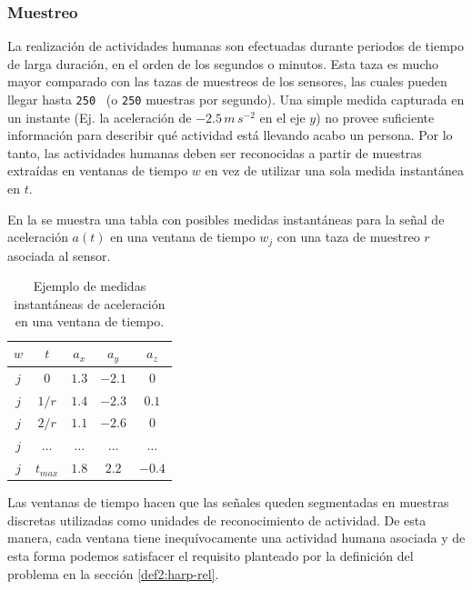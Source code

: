 \subsubsection{Muestreo}

\label{ssec44:sampling}La realización de actividades humanas son
efectuadas durante periodos de tiempo de larga duración, en el orden
de los segundos o minutos. Esta taza es mucho mayor comparado con
las tazas de muestreos de los sensores, las cuales pueden llegar hasta
\texttt{250 } (o \texttt{250} muestras por segundo). Una
simple medida capturada en un instante (Ej. la aceleración de $-2.5\,m\,s^{-2}$
en el eje $y$) no provee suficiente información para describir qué
actividad está llevando acabo un persona. Por lo tanto, las actividades
humanas deben ser reconocidas a partir de muestras extraídas en ventanas
de tiempo $w$ en vez de utilizar una sola medida instantánea en $t$. 

En la  se muestra una tabla con posibles medidas
instantáneas para la señal de aceleración $a(t)$ en una ventana de
tiempo $w_{j}$ con una taza de muestreo $r$ asociada al sensor.

\begin{table}[!tbph]
\begin{centering}
\begin{tabular}{|c|c|c|c|c|}
\hline 
$w$ & $t$ & $a_{x}$ & $a_{y}$ & $a_{z}$\tabularnewline
\hline 
\hline 
$j$ & $0$ & \texttt{$1.3$} & \texttt{$-2.1$} & \texttt{$0$}\tabularnewline
\hline 
$j$ & $1/r$ & \texttt{$1.4$} & \texttt{$-2.3$} & \texttt{$0.1$}\tabularnewline
\hline 
$j$ & $2/r$ & \texttt{$1.1$} & \texttt{$-2.6$} & \texttt{$0$}\tabularnewline
\hline 
$j$ & $\ldots$ & \texttt{$\ldots$} & \texttt{$\ldots$} & \texttt{$\ldots$}\tabularnewline
\hline 
$j$ & $t_{max}$ & \texttt{$1.8$} & \texttt{$2.2$} & \texttt{$-0.4$}\tabularnewline
\hline 
\end{tabular}
\par\end{centering}
\caption[Medidas instantáneas de aceleración ]{\label{tab4:ex-signal}Ejemplo de medidas instantáneas de aceleración
en una ventana de tiempo.}
\end{table}

Las ventanas de tiempo hacen que las señales queden segmentadas en
muestras discretas utilizadas como unidades de reconocimiento de actividad.
De esta manera, cada ventana tiene inequívocamente una actividad humana
asociada y de esta forma podemos satisfacer el requisito planteado
por la definición del problema en la sección \ref{def2:harp-rel}. 

